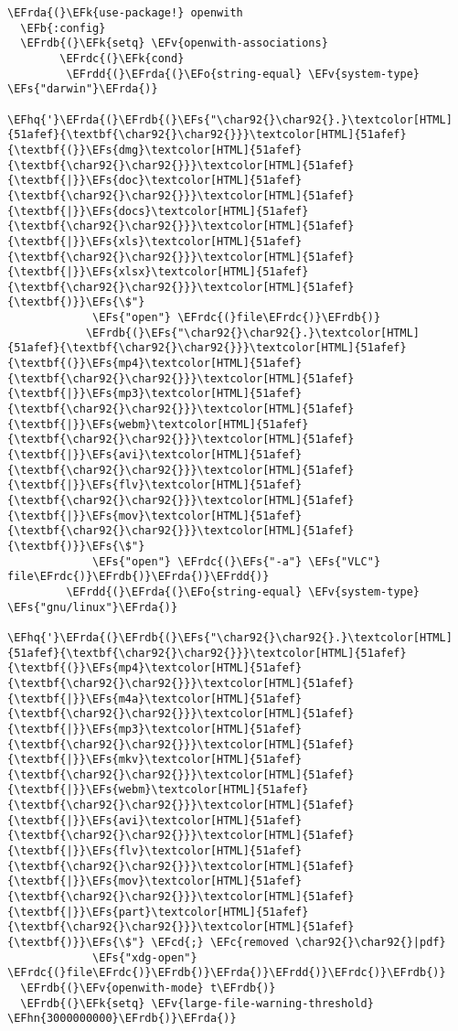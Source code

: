 \documentclass[a4wide,10pt]{article}
\newcommand{\EFc}[1]{\textcolor{EFc}{#1}} %
\newcommand{\EFcd}[1]{\textcolor{EFcd}{#1}} %
\newcommand{\EFs}[1]{\textcolor{EFs}{#1}} %
\newcommand{\EFk}[1]{\textcolor{EFk}{#1}} %
\newcommand{\EFb}[1]{\textcolor{EFb}{#1}} %
\newcommand{\EFv}[1]{\textcolor{EFv}{#1}} %
\newcommand{\EFo}[1]{\textcolor{EFo}{#1}} %
\newcommand{\EFhn}[1]{\textcolor{EFhn}{\textbf{#1}}} %
\newcommand{\EFhq}[1]{\textcolor{EFhq}{#1}} %
\newcommand{\EFrda}[1]{\textcolor{EFrda}{#1}} %
\newcommand{\EFrdb}[1]{\textcolor{EFrdb}{#1}} %
\newcommand{\EFrdc}[1]{\textcolor{EFrdc}{#1}} %
\newcommand{\EFrdd}[1]{\textcolor{EFrdd}{#1}} %
\begin{document}
\begin{Code}
\begin{Verbatim}
\EFrda{(}\EFk{use-package!} openwith
  \EFb{:config}
  \EFrdb{(}\EFk{setq} \EFv{openwith-associations}
        \EFrdc{(}\EFk{cond}
         \EFrdd{(}\EFrda{(}\EFo{string-equal} \EFv{system-type} \EFs{"darwin"}\EFrda{)}
          \EFhq{'}\EFrda{(}\EFrdb{(}\EFs{"\char92{}\char92{}.}\textcolor[HTML]{51afef}{\textbf{\char92{}\char92{}}}\textcolor[HTML]{51afef}{\textbf{(}}\EFs{dmg}\textcolor[HTML]{51afef}{\textbf{\char92{}\char92{}}}\textcolor[HTML]{51afef}{\textbf{|}}\EFs{doc}\textcolor[HTML]{51afef}{\textbf{\char92{}\char92{}}}\textcolor[HTML]{51afef}{\textbf{|}}\EFs{docs}\textcolor[HTML]{51afef}{\textbf{\char92{}\char92{}}}\textcolor[HTML]{51afef}{\textbf{|}}\EFs{xls}\textcolor[HTML]{51afef}{\textbf{\char92{}\char92{}}}\textcolor[HTML]{51afef}{\textbf{|}}\EFs{xlsx}\textcolor[HTML]{51afef}{\textbf{\char92{}\char92{}}}\textcolor[HTML]{51afef}{\textbf{)}}\EFs{\$"}
             \EFs{"open"} \EFrdc{(}file\EFrdc{)}\EFrdb{)}
            \EFrdb{(}\EFs{"\char92{}\char92{}.}\textcolor[HTML]{51afef}{\textbf{\char92{}\char92{}}}\textcolor[HTML]{51afef}{\textbf{(}}\EFs{mp4}\textcolor[HTML]{51afef}{\textbf{\char92{}\char92{}}}\textcolor[HTML]{51afef}{\textbf{|}}\EFs{mp3}\textcolor[HTML]{51afef}{\textbf{\char92{}\char92{}}}\textcolor[HTML]{51afef}{\textbf{|}}\EFs{webm}\textcolor[HTML]{51afef}{\textbf{\char92{}\char92{}}}\textcolor[HTML]{51afef}{\textbf{|}}\EFs{avi}\textcolor[HTML]{51afef}{\textbf{\char92{}\char92{}}}\textcolor[HTML]{51afef}{\textbf{|}}\EFs{flv}\textcolor[HTML]{51afef}{\textbf{\char92{}\char92{}}}\textcolor[HTML]{51afef}{\textbf{|}}\EFs{mov}\textcolor[HTML]{51afef}{\textbf{\char92{}\char92{}}}\textcolor[HTML]{51afef}{\textbf{)}}\EFs{\$"}
             \EFs{"open"} \EFrdc{(}\EFs{"-a"} \EFs{"VLC"} file\EFrdc{)}\EFrdb{)}\EFrda{)}\EFrdd{)}
         \EFrdd{(}\EFrda{(}\EFo{string-equal} \EFv{system-type} \EFs{"gnu/linux"}\EFrda{)}
          \EFhq{'}\EFrda{(}\EFrdb{(}\EFs{"\char92{}\char92{}.}\textcolor[HTML]{51afef}{\textbf{\char92{}\char92{}}}\textcolor[HTML]{51afef}{\textbf{(}}\EFs{mp4}\textcolor[HTML]{51afef}{\textbf{\char92{}\char92{}}}\textcolor[HTML]{51afef}{\textbf{|}}\EFs{m4a}\textcolor[HTML]{51afef}{\textbf{\char92{}\char92{}}}\textcolor[HTML]{51afef}{\textbf{|}}\EFs{mp3}\textcolor[HTML]{51afef}{\textbf{\char92{}\char92{}}}\textcolor[HTML]{51afef}{\textbf{|}}\EFs{mkv}\textcolor[HTML]{51afef}{\textbf{\char92{}\char92{}}}\textcolor[HTML]{51afef}{\textbf{|}}\EFs{webm}\textcolor[HTML]{51afef}{\textbf{\char92{}\char92{}}}\textcolor[HTML]{51afef}{\textbf{|}}\EFs{avi}\textcolor[HTML]{51afef}{\textbf{\char92{}\char92{}}}\textcolor[HTML]{51afef}{\textbf{|}}\EFs{flv}\textcolor[HTML]{51afef}{\textbf{\char92{}\char92{}}}\textcolor[HTML]{51afef}{\textbf{|}}\EFs{mov}\textcolor[HTML]{51afef}{\textbf{\char92{}\char92{}}}\textcolor[HTML]{51afef}{\textbf{|}}\EFs{part}\textcolor[HTML]{51afef}{\textbf{\char92{}\char92{}}}\textcolor[HTML]{51afef}{\textbf{)}}\EFs{\$"} \EFcd{;} \EFc{removed \char92{}\char92{}|pdf}
             \EFs{"xdg-open"} \EFrdc{(}file\EFrdc{)}\EFrdb{)}\EFrda{)}\EFrdd{)}\EFrdc{)}\EFrdb{)}
  \EFrdb{(}\EFv{openwith-mode} t\EFrdb{)}
  \EFrdb{(}\EFk{setq} \EFv{large-file-warning-threshold} \EFhn{3000000000}\EFrdb{)}\EFrda{)}


\end{Verbatim}
\end{Code}
\end{document}
